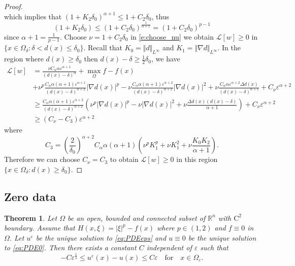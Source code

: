\documentclass[11pt,reqno]{amsart}
\numberwithin{figure}{section}
\theoremstyle{plain}
\newtheorem{thm}{Theorem}[section]
\theoremstyle{remark}
\numberwithin{equation}{section}
\newcommand{\R}{\mathbb{R}}
\begin{document}
\begin{proof}
\begin{equation*}
\end{equation*}
which implies that $(1+K_2\delta_0)^{\alpha+1} \leq 1 + C_2\delta_0$, thus
\begin{equation}\label{e:cru1}
    (1+K_2\delta_0) \leq (1+C_2\delta_0)^{\frac{1}{\alpha+1}} = (1+C_2\delta_0)^{p-1}
\end{equation}
since $\alpha+1 = \frac{1}{p-1}$. Choose $\nu = 1+C_2\delta_0$ in \eqref{e:choose_nu} we obtain $\mathcal{L}[w]\geq 0$ in $\{x\in \Omega_\delta: \delta <d(x)\leq \delta_0\}$. Recall that $K_0 = \Vert d\Vert_{L^\infty}$ and $K_1 = \Vert \nabla d\Vert_{L^\infty}$. In the region where $d(x)\geq \delta_0$ then $d(x)-\delta \geq \frac{1}{2}\delta_0$, we have 
\begin{align*}
    \mathcal{L}[w] &= \frac{\nu C_\alpha\alpha\varepsilon^{\alpha+1}}{(d(x)-\delta)^\alpha} + \max_{\Omega} f - f(x)\\
    &+  \nu^p\frac{C_\alpha\alpha(\alpha+1)\varepsilon^{\alpha+1}}{(d(x)-\delta)^{\alpha+2}}|\nabla d(x)|^p - \nu \frac{C_\alpha \alpha(\alpha+1)\varepsilon^{\alpha+2}}{(d(x)-\delta)^{\alpha+2}}|\nabla d(x)|^2 
    + \nu \frac{C_\alpha \alpha \varepsilon^{\alpha+2}\Delta d(x)}{(d(x)-\delta)^{\alpha+1}} + C_\nu \varepsilon^{\alpha+2}\\
    &\geq \frac{C_\alpha \alpha(\alpha+1)\varepsilon^{\alpha+2}}{(d(x)-\delta)^{\alpha+2}}\left(\nu^p|\nabla d(x)|^p - \nu |\nabla d(x)|^2 + \nu \frac{\Delta d(x)(d(x)-\delta)}{\alpha+1}\right) + C_\nu \varepsilon^{\alpha+2}\\
    &\geq (C_\nu - C_3)\varepsilon^{\alpha+2}
\end{align*}
where 
\begin{equation*}
    C_3 = \left(\frac{2}{\delta_0}\right)^{\alpha+2} C_\alpha\alpha(\alpha+1) \left(\nu^pK_1^p + \nu K_1^2 + \nu \frac{K_0K_2}{\alpha+1}\right).
\end{equation*}
Therefore we can choose $C_\nu = C_3$ to obtain $\mathcal{L}[w]\geq 0$ in this region $\{x\in \Omega_\delta:d(x)\geq \delta_0\}$.
\end{proof}

\subsection{Zero data}
\begin{thm}\label{thm:rate_doubling0} Let $\Omega$ be an open, bounded and connected subset of $\R^n$ with $\mathrm{C}^2$ boundary. Assume that $H(x,\xi) = |\xi|^p - f(x)$ where $p\in\left(1,2\right)$ and $f\equiv 0$ in $\Omega$. Let $u^\varepsilon$ be the unique solution to \eqref{eq:PDEeps} and $u \equiv 0 $ be the unique solution to \eqref{eq:PDE0}. Then there exists a constant $C$ independent of $\varepsilon$ such that
\begin{equation*}
 -C \varepsilon^{\frac{1}{2}}\leq  u^\varepsilon(x) - u(x) \leq C\varepsilon \quad  \text{for} \quad x\in \Omega_{\varepsilon}.
\end{equation*}
\end{thm}
\end{document}
